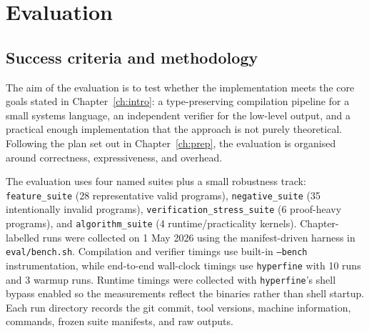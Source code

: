 
\chapter{Evaluation}\label{ch:eval}

\section{Success criteria and methodology}

The aim of the evaluation is to test whether the implementation meets the core
goals stated in Chapter~\ref{ch:intro}: a type-preserving compilation pipeline
for a small systems language, an independent verifier for the low-level output,
and a practical enough implementation that the approach is not purely
theoretical. Following the plan set out in Chapter~\ref{ch:prep}, the
evaluation is organised around correctness, expressiveness, and overhead.

The evaluation uses four named suites plus a small robustness track:
\texttt{feature\_suite} (28 representative valid programs),
\texttt{negative\_suite} (35 intentionally invalid programs),
\texttt{verification\_stress\_suite} (6 proof-heavy programs), and
\texttt{algorithm\_suite} (4 runtime/practicality kernels). Chapter-labelled
runs were collected on 1 May 2026 using the manifest-driven harness in
\texttt{eval/bench.sh}. Compilation and verifier timings use built-in
\texttt{--bench} instrumentation, while end-to-end wall-clock timings use
\texttt{hyperfine} with 10 runs and 3 warmup runs. Runtime timings were
collected with \texttt{hyperfine}'s shell bypass enabled so the measurements
reflect the binaries rather than shell startup. Each run directory records the
git commit, tool versions, machine information, commands, frozen suite
manifests, and raw outputs.

